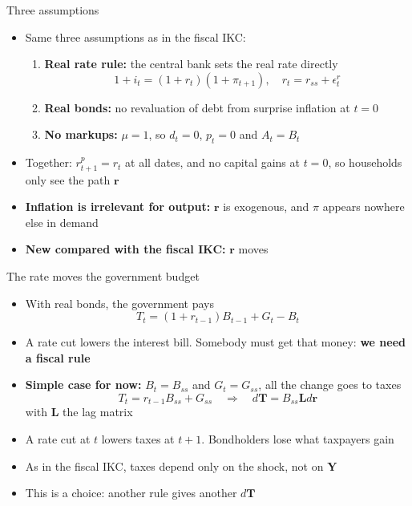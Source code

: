 \documentclass[10pt,english]{beamer}
\begin{document}
\begin{frame}{Three assumptions}
\begin{itemize}
\item <+->Same three assumptions as in the fiscal IKC:
\begin{enumerate}
\item <+->\textbf{Real rate rule:} the central bank sets the real rate directly
\[
1+i_{t}=(1+r_{t})(1+\pi_{t+1}),\quad r_{t}=r_{ss}+\epsilon_{t}^{r}
\]
\item <+->\textbf{Real bonds:} no revaluation of debt from surprise inflation at $t=0$
\item <+->\textbf{No markups:} $\mu=1$, so $d_{t}=0$, $p_{t}=0$ and $A_{t}=B_{t}$
\end{enumerate}
\item <+->Together: $r_{t+1}^{p}=r_{t}$ at all dates, and no capital gains at $t=0$, so households only see the path $\boldsymbol{r}$
\item <+->\textbf{Inflation is irrelevant for output:} $\boldsymbol{r}$ is exogenous, and $\pi$ appears nowhere else in demand
\item <+->\textbf{New compared with the fiscal IKC:} $\boldsymbol{r}$ moves
\end{itemize}
\end{frame}
%
\begin{frame}{The rate moves the government budget}
\begin{itemize}
\item <+->With real bonds, the government pays
\[
T_{t}=(1+r_{t-1})B_{t-1}+G_{t}-B_{t}
\]
\item <+->A rate cut lowers the interest bill. Somebody must get that money: \textbf{we need a fiscal rule}
\item <+->\textbf{Simple case for now:} $B_{t}=B_{ss}$ and $G_{t}=G_{ss}$, all the change goes to taxes
\[
T_{t}=r_{t-1}B_{ss}+G_{ss}\quad\Rightarrow\quad d\boldsymbol{T}=B_{ss}\boldsymbol{L}d\boldsymbol{r}
\]
with $\boldsymbol{L}$ the lag matrix
\item <+->A rate cut at $t$ lowers taxes at $t+1$. Bondholders lose what taxpayers gain
\item <+->As in the fiscal IKC, taxes depend only on the shock, not on $\boldsymbol{Y}$
\item <+->This is a choice: another rule gives another $d\boldsymbol{T}$
\end{itemize}
\end{frame}
%
\end{document}
